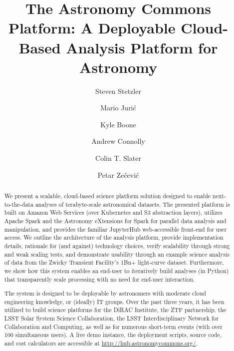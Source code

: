 \documentclass[twocolumn, linenumbers]{aastex631}
\begin{document}
\title{The Astronomy Commons Platform: A Deployable Cloud-Based Analysis Platform for Astronomy}


\author[0000-0002-7712-6678]{Steven Stetzler}

\author[0000-0003-1996-9252]{Mario Juri\'c}

\author[0000-0002-5828-6211]{Kyle Boone}

\author[0000-0001-5576-8189]{Andrew Connolly}

\author[0000-0002-0558-0521]{Colin T. Slater}

\author[0000-0002-2651-243X]{Petar Ze\v{c}evi\'c}

\begin{abstract}

We present a scalable, cloud-based science platform solution designed to enable next-to-the-data analyses of terabyte-scale astronomical datasets. The presented platform is built on Amazon Web Services (over Kubernetes and S3 abstraction layers), utilizes Apache Spark and the Astronomy eXtensions for Spark for parallel data analysis and manipulation, and provides the familiar JupyterHub web-accessible front-end for user access. We outline the architecture of the analysis platform, provide implementation details, rationale for (and against) technology choices, verify scalability through strong and weak scaling tests, and demonstrate usability through an example science analysis of data from the Zwicky Transient Facility's 1Bn+ light-curve dataset. Furthermore, we show how this system enables an end-user to iteratively build analyses (in Python) that transparently scale processing with no need for end-user interaction.

The system is designed to be deployable by astronomers with moderate cloud engineering knowledge, or (ideally) IT groups. Over the past three years, it has been utilized to build science platforms for the DiRAC Institute, the ZTF partnership, the LSST Solar System Science Collaboration, the LSST Interdisciplinary Network for Collaboration and Computing, as well as for numerous short-term events (with over 100 simultaneous users). A live demo instance, the deployment scripts, source code, and cost calculators are accessible at \url{http://hub.astronomycommons.org/}. 

\end{abstract}
\end{document}
